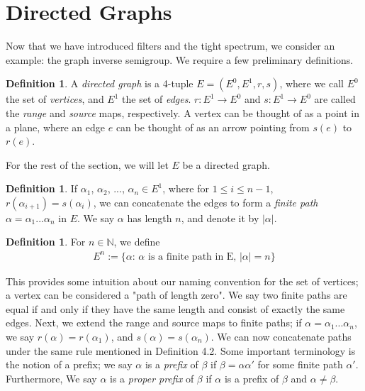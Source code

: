 \documentclass[12pt]{article}
\theoremstyle{definition}
\newtheorem{definition}[theorem]{Definition}
\begin{document}
\section{Directed Graphs}
    Now that we have introduced filters and the tight spectrum, we consider an
    example: the graph inverse semigroup. We require a few preliminary definitions.

\begin{definition} 
    A \emph{directed graph} is a 4-tuple $E = (E^0, E^1, r, s)$, where we call $E^0$
    the set of \emph{vertices}, and $E^1$ the set of \emph{edges}. $r: E^1 \to E^0$ and $s: E^1 \to E^0$
    are called the \emph{range} and \emph{source} maps, respectively. A vertex can be thought of as a point
    in a plane, where an edge $e$ can be thought of as an arrow pointing from $s(e)$ to $r(e)$.
\end{definition}

For the rest of the section, we will let $E$ be a directed graph.

\begin{definition}
    If $\alpha_1$, $\alpha_2$, ..., $\alpha_n \in E^1$,
    where for $1 \leq i \leq n-1$, $r(\alpha_{i+1}) = s(\alpha_i)$, we can concatenate
    the edges to form a \textit{finite path} $\alpha = \alpha_1 ... \alpha_n$ in $E$. We say
    $\alpha$ has length $n$, and denote it by $|\alpha|$.
\end{definition}

\begin{definition}
    For $n \in \mathbb{N}$, we define
    \begin{align*}
        E^n := \{\alpha\text{: $\alpha$ is a finite path in E, $|\alpha| = n$}\}
    \end{align*}
\end{definition}

This provides some intuition about our naming convention for the set of vertices; a vertex can be considered a "path of length zero". 
We say two finite paths are equal if and only if they have the same length and consist of exactly the same edges.
Next, we extend the range and source maps to finite paths; if $\alpha = \alpha_1 ... \alpha_n$,
we say $r(\alpha) = r(\alpha_1)$, and $s(\alpha) = s(\alpha_n)$. We can now concatenate paths
under the same rule mentioned in Definition 4.2. Some important terminology is the notion of a prefix;
we say $\alpha$ is a \emph{prefix} of $\beta$ if $\beta = \alpha \alpha'$ for some finite path $\alpha'$. Furthermore,
We say $\alpha$ is a \emph{proper prefix} of $\beta$ if $\alpha$ is a prefix of $\beta$ and $\alpha \neq \beta$.
\end{document}
